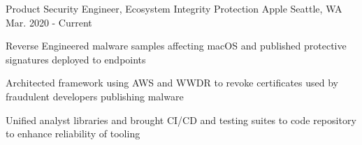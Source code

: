 


\begin{cventries}




\cventry
{Product Security Engineer, Ecosystem Integrity Protection} %
{Apple} %
{Seattle, WA} %
{Mar. 2020 - Current} %
{ %
\begin{cvitems}
\item {Reverse Engineered malware samples affecting macOS and published protective signatures deployed to endpoints}
\item {Architected framework using AWS and WWDR to revoke certificates used by fraudulent developers publishing malware}
\item {Unified analyst libraries and brought CI/CD and testing suites to code repository to enhance reliability of tooling}
\end{cvitems}
}



\end{cventries}

